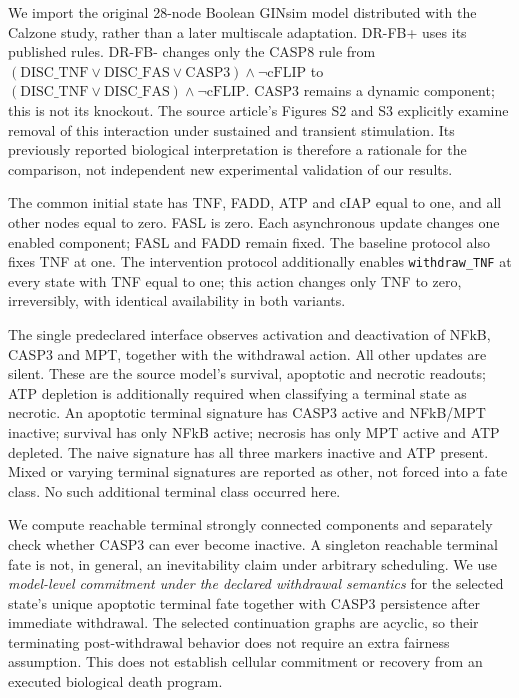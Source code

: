 \documentclass{ws-jbcb}
\numberwithin{equation}{section}
\begin{document}
We import the original 28-node Boolean GINsim model distributed with the
Calzone study, rather than a later multiscale adaptation.\cite{Calzone2010}
DR-FB+ uses its published rules. DR-FB- changes only the CASP8 rule from
$(\mathrm{DISC\_TNF}\lor\mathrm{DISC\_FAS}\lor\mathrm{CASP3})\land
\neg\mathrm{cFLIP}$ to
$(\mathrm{DISC\_TNF}\lor\mathrm{DISC\_FAS})\land\neg\mathrm{cFLIP}$.
CASP3 remains a dynamic component; this is not its knockout.
The source article's Figures S2 and S3 explicitly examine removal of this
interaction under sustained and transient stimulation. Its previously reported
biological interpretation is therefore a rationale for the comparison, not
independent new experimental validation of our results.

The common initial state has TNF, FADD, ATP and cIAP equal to one, and all other
nodes equal to zero. FASL is zero. Each asynchronous update changes one enabled
component; FASL and FADD remain fixed. The baseline protocol also fixes TNF at
one. The intervention protocol additionally enables \texttt{withdraw\_TNF}
at every state with TNF equal to one; this action changes only TNF to zero,
irreversibly, with identical availability in both variants.

The single predeclared interface observes activation and deactivation of
NFkB, CASP3 and MPT, together with the withdrawal action. All other updates
are silent. These are the source model's survival, apoptotic and necrotic
readouts; ATP depletion is additionally required when classifying a terminal
state as necrotic. An apoptotic terminal signature has CASP3 active and
NFkB/MPT inactive; survival has only NFkB active; necrosis has only MPT active
and ATP depleted. The naive signature has all three markers inactive and ATP
present. Mixed or varying terminal signatures are reported as other, not
forced into a fate class. No such additional terminal class occurred here.

We compute reachable terminal strongly connected components and separately
check whether CASP3 can ever become inactive. A singleton reachable terminal
fate is not, in general, an inevitability claim under arbitrary scheduling.
We use \emph{model-level commitment under the declared withdrawal semantics}
for the selected state's unique apoptotic terminal fate together with
CASP3 persistence after immediate withdrawal. The selected continuation graphs
are acyclic, so their terminating post-withdrawal behavior does not require an
extra fairness assumption. This does not establish cellular commitment or
recovery from an executed biological death program.
\end{document}
